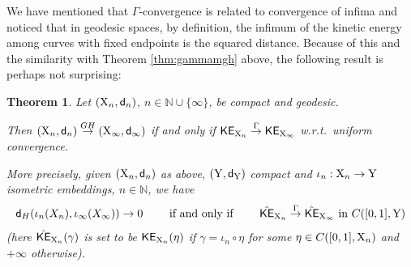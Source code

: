 \documentclass[11pt]{article}
\numberwithin{equation}{section}
\newtheorem{theorem}{Theorem}[section]
\newcommand{\N}{\mathbb{N}}
\newcommand{\X}{{\rm X}}
\newcommand{\Y}{{\rm Y}}
\newcommand{\sfd}{{\sf d}}
\begin{document}
We have mentioned that $\Gamma$-convergence is related to convergence of infima and noticed that in geodesic spaces, by definition, the infimum of the kinetic energy among curves with fixed endpoints is the  squared distance. Because of this and the similarity with Theorem \ref{thm:gammamgh} above, the following result is perhaps not surprising:
\begin{theorem}\label{thm:ghgamma} Let $(\X_n,\sfd_n)$, $n\in \N\cup\{\infty\}$, be compact and geodesic. 

Then $(\X_n,\sfd_n)\stackrel{GH}\to(\X_\infty,\sfd_\infty)$ if and only if ${\sf KE}_{\X_n}\stackrel{\Gamma}\to {\sf KE}_{\X_\infty}$ w.r.t.\ uniform convergence.

More precisely, given $(\X_n,\sfd_n)$ as above, $(\Y,\sfd_\Y)$ compact and $\iota_n:\X_n\to\Y$ isometric embeddings, $n\in\N$, we have 
\[
\text{$\sfd_H(\iota_n(X_n),\iota_\infty(X_\infty))\to 0\qquad$ if and only if $\qquad\hat{\sf KE}_{\X_n}\stackrel{\Gamma}\to \hat{\sf KE}_{\X_\infty}$ in $C([0,1],\Y)$}
\]
(here $\hat{\sf KE}_{\X_n}(\gamma)$ is set to be ${\sf KE}_{\X_n}(\eta)$ if $\gamma=\iota_n\circ\eta$ for some $\eta\in C([0,1],\X_n)$ and $+\infty$ otherwise).
\end{theorem}
\end{document}
